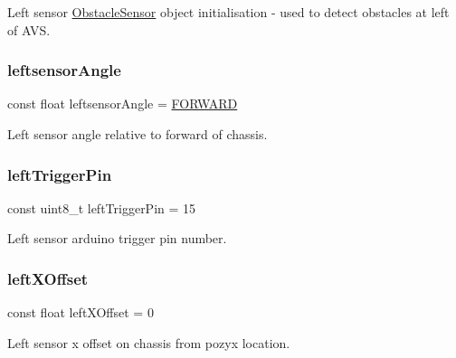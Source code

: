 Left sensor \mbox{\hyperlink{class_obstacle_sensor}{Obstacle\+Sensor}} object initialisation -\/ used to detect obstacles at left of A\+VS. 

\mbox{\label{bot_main_8ino_a8be5324bad65fa0bad41e0c70066a958}} 
\subsubsection{\texorpdfstring{leftsensor\+Angle}{leftsensorAngle}}
{\footnotesize\ttfamily const float leftsensor\+Angle = \mbox{\hyperlink{bot_main_8ino_a6ddfdda7a062d10cff4a72b76b44aeb8}{F\+O\+R\+W\+A\+RD}}}



Left sensor angle relative to forward of chassis. 

\mbox{\label{bot_main_8ino_a297d5238270dc0d92e1a65b016a79f2e}} 
\subsubsection{\texorpdfstring{left\+Trigger\+Pin}{leftTriggerPin}}
{\footnotesize\ttfamily const uint8\+\_\+t left\+Trigger\+Pin = 15}



Left sensor arduino trigger pin number. 

\mbox{\label{bot_main_8ino_a2d121af61e2977de12f5bfbbe8559dca}} 
\subsubsection{\texorpdfstring{left\+X\+Offset}{leftXOffset}}
{\footnotesize\ttfamily const float left\+X\+Offset = 0}



Left sensor x offset on chassis from pozyx location. 

\mbox{\label{bot_main_8ino_a7be9826e4f54e376321bcdea4177a8ed}} 
